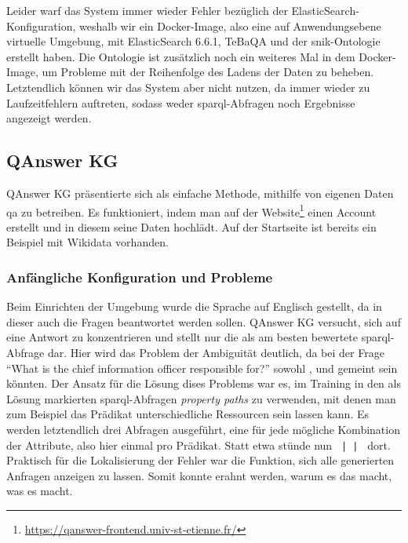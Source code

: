 Leider warf das System immer wieder Fehler bezüglich der ElasticSearch-Konfiguration, weshalb wir ein Docker-Image,
also eine auf Anwendungsebene virtuelle Umgebung, mit ElasticSearch 6.6.1, TeBaQA und der \ac{snik}-Ontologie erstellt haben.
Die Ontologie ist zusätzlich noch ein weiteres Mal in dem Docker-Image, um Probleme mit der Reihenfolge des Ladens der Daten zu beheben.
Letztendlich können wir das System aber nicht nutzen, da immer wieder zu Laufzeitfehlern auftreten,
sodass weder \ac{sparql}-Abfragen noch Ergebnisse angezeigt werden.

\subsection{QAnswer KG}

QAnswer KG präsentierte sich als einfache Methode, mithilfe von eigenen Daten \acl{qa} zu betreiben.
Es funktioniert, indem man auf der Website\footnote{\url{https://qanswer-frontend.univ-st-etienne.fr/}} einen Account erstellt und in diesem seine Daten hochlädt.
Auf der Startseite ist bereits ein Beispiel mit Wikidata vorhanden.

\subsubsection{Anfängliche Konfiguration und Probleme}

Beim Einrichten der Umgebung wurde die Sprache auf Englisch gestellt, da in dieser auch die Fragen beantwortet werden sollen.
QAnswer KG versucht, sich auf eine Antwort zu konzentrieren und stellt nur die als am besten bewertete \ac{sparql}-Abfrage dar.
Hier wird das Problem der Ambiguität deutlich, da bei der Frage \enquote{What is the chief information officer responsible for?} sowohl
,  und  gemeint sein könnten.
Der Ansatz für die Lösung dises Problems war es, im Training in den als Lösung markierten \ac{sparql}-Abfragen \emph{property paths} zu verwenden,
mit denen man zum Beispiel das Prädikat unterschiedliche Ressourcen sein lassen kann.
Es werden letztendlich drei Abfragen ausgeführt, eine für jede mögliche Kombination der Attribute, also hier einmal pro Prädikat.
Statt etwa \texttt{} stünde nun \texttt{ |  | } dort.
Praktisch für die Lokalisierung der Fehler war die Funktion, sich alle generierten Anfragen anzeigen zu lassen.
Somit konnte erahnt werden, warum es das macht, was es macht.

